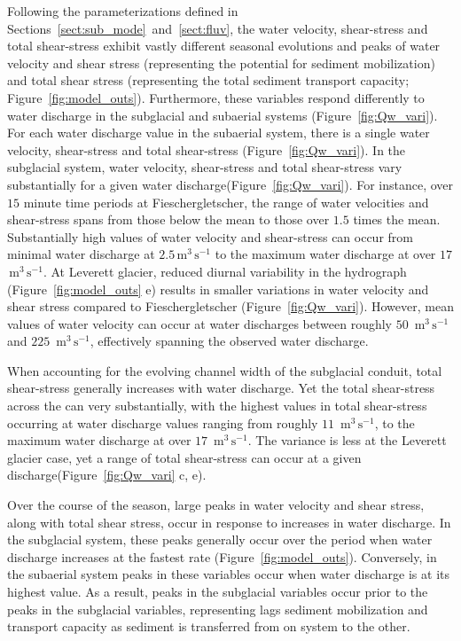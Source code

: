 \documentclass[draft]{agujournal2019}
\newcommand{\unit}[1]{$\mathrm{#1}$}
\begin{document}
 
Following the parameterizations defined in Sections~\ref{sect:sub_mode}~and~\ref{sect:fluv}, the water velocity, shear-stress and total shear-stress exhibit vastly different seasonal evolutions and peaks of water velocity and shear stress (representing the potential for sediment mobilization) and total shear stress (representing the total sediment transport capacity; Figure~\ref{fig:model_outs}).
Furthermore, these variables respond differently to water discharge in the subglacial and subaerial systems (Figure~\ref{fig:Qw_vari}).
For each water discharge value in the subaerial system, there is a single water velocity, shear-stress and total shear-stress (Figure~\ref{fig:Qw_vari}).
In the subglacial system, water velocity, shear-stress and total shear-stress vary substantially for a given water discharge(Figure~\ref{fig:Qw_vari}).
For instance, over $15$ minute time periods at Fieschergletscher, the range of water velocities and shear-stress spans from those below the mean to those over $1.5$ times the mean.
Substantially high values of water velocity and shear-stress can occur from minimal water discharge at $2.5$\,\unit{m}$^3$\,\unit{s}$^{-1}$ to the maximum water discharge at over $17$ \,\unit{m}$^3$\,\unit{s}$^{-1}$.
At Leverett glacier, reduced diurnal variability in the hydrograph  (Figure~\ref{fig:model_outs} e) results in smaller variations in water velocity and shear stress compared to Fieschergletscher (Figure~\ref{fig:Qw_vari}).
However, mean values of water velocity can occur at water discharges between roughly $50$ \,\unit{m}$^3$\,\unit{s}$^{-1}$ and $225$ \,\unit{m}$^3$\,\unit{s}$^{-1}$, effectively spanning the observed water discharge. 

When accounting for the evolving channel width of the subglacial conduit, total shear-stress generally increases with water discharge.
Yet the total shear-stress across the can very substantially, with the highest values in total shear-stress occurring at water discharge values ranging from roughly $11$ \,\unit{m}$^3$\,\unit{s}$^{-1}$, to the maximum water discharge at over $17$ \,\unit{m}$^3$\,\unit{s}$^{-1}$.
The variance is less at the Leverett glacier case, yet a range of total shear-stress can occur at a given discharge(Figure~\ref{fig:Qw_vari} c, e).

Over the course of the season, large peaks in water velocity and shear stress, along with total shear stress, occur in response to increases in water discharge.
In the subglacial system, these peaks generally occur over the period when water discharge increases at the fastest rate (Figure~\ref{fig:model_outs}).
Conversely, in the subaerial system peaks in these variables occur when water discharge is at its highest value.
As a result, peaks in the subglacial variables occur prior to the peaks in the subglacial variables, representing lags sediment mobilization and  transport capacity as sediment is transferred from on system to the other.
\end{document}
